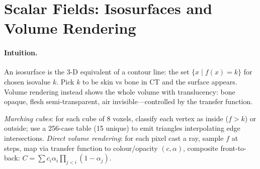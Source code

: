 \section{Scalar Fields: Isosurfaces and Volume Rendering}
\label{sec:scalar}
\paragraph{Intuition.} An isosurface is the 3-D equivalent of a contour line: the set $\{x\mid f(x)=k\}$ for chosen isovalue $k$. Pick $k$ to be skin vs bone in CT and the surface appears. Volume rendering instead shows the whole volume with translucency: bone opaque, flesh semi-transparent, air invisible---controlled by the transfer function.

\begin{definition}\label{def:marching}
\emph{Marching cubes}: for each cube of 8 voxels, classify each vertex as inside ($f>k$) or outside; use a 256-case table (15 unique) to emit triangles interpolating edge intersections. \emph{Direct volume rendering}: for each pixel cast a ray, sample $f$ at steps, map via transfer function to colour/opacity $(c,\alpha)$, composite front-to-back: $C=\sum c_i\alpha_i\prod_{j<i}(1-\alpha_j)$.
\end{definition}

